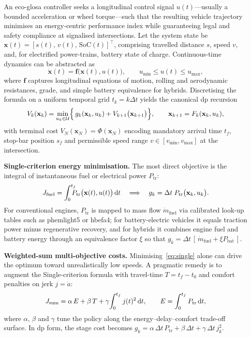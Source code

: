 An \ac{eco-glosa} controller seeks a longitudinal control signal $u(t)$—usually a bounded acceleration or wheel torque—such that the resulting vehicle trajectory minimises an energy‐centric performance index while guaranteeing legal and safety compliance at signalised intersections. Let the system state be $\mathbf x(t)=[s(t),\,v(t),\,\mathrm{SoC}(t)]^{\!\top}$, comprising travelled distance $s$, speed $v$, and, for electrified power-trains, battery state of charge. Continuous-time dynamics can be abstracted as
\[
\dot{\mathbf x}(t)=\mathbf f\bigl(\mathbf x(t),u(t)\bigr),
\qquad 
u_{\min}\le u(t)\le u_{\max},
\]
where $\mathbf f$ captures longitudinal equations of motion, rolling and aerodynamic resistances, grade, and simple battery equivalence for hybrids.  Discretising the formula on a uniform temporal grid $t_k=k\Delta t$ yields the canonical \ac{dp} recursion
\[
V_k(\mathbf x_k)=\min_{u_k\in\mathcal U}\Bigl\{\,g_k(\mathbf x_k,u_k)+V_{k+1}\bigl(\mathbf x_{k+1}\bigr)\Bigr\},
\qquad 
\mathbf x_{k+1}=F_k(\mathbf x_k,u_k),
\]
with terminal cost $V_{N}(\mathbf x_N)=\Phi(\mathbf x_N)$ encoding mandatory arrival time $t_f$, stop-bar position $s_f$ and permissible speed range $v\in[v_{\min},v_{\max}]$ at the intersection.

\textbf{Single-criterion energy minimisation.}
The most direct objective is the integral of instantaneous fuel or electrical power $P_{\text{tr}}$:
\[
J_{\text{fuel}}=\int_{0}^{t_f}\!\!\!\!\!P_{\text{tr}}\bigl(\mathbf x(t),u(t)\bigr)\,{\rm d}t\quad\Longrightarrow\quad 
g_k=\Delta t\;P_{\text{tr}}\bigl(\mathbf x_k,u_k\bigr).
\]
For conventional engines, $P_{\text{tr}}$ is mapped to mass flow $\dot m_{\text{fuel}}$ via calibrated look-up tables such as \ac{phem}light5 or \ac{hbefa}4; for battery-electric vehicles it equals traction power minus regenerative recovery, and for hybrids it combines engine fuel and battery energy through an equivalence factor $\xi$ so that $g_k=\Delta t\,[\,\dot m_{\text{fuel}}+\xi P_{\text{bat}}\,]$.

\textbf{Weighted-sum multi-objective costs.}
Minimising~\eqref{eq:single} alone can drive the optimum toward unrealistically low speeds. A pragmatic remedy is to augment the Single-criterion formula with travel-time $T=t_f-t_0$ and comfort penalties on jerk $j=\dot a$:
\[
J_{\mathrm{sum}}=\alpha\,E+\beta\,T+\gamma\!\int_{0}^{t_f}j(t)^2\,{\rm d}t,
\qquad 
E=\int_{0}^{t_f}P_{\text{tr}}\,{\rm d}t,
\label{eq:weighted}
\]
where $\alpha$, $\beta$ and $\gamma$ tune the policy along the energy–delay–comfort trade-off surface. In \ac{dp} form, the stage cost becomes
$g_k=\alpha\,\Delta t\,P_{\text{tr}}+\beta\,\Delta t +\gamma\,\Delta t\,j_k^{2}$.


